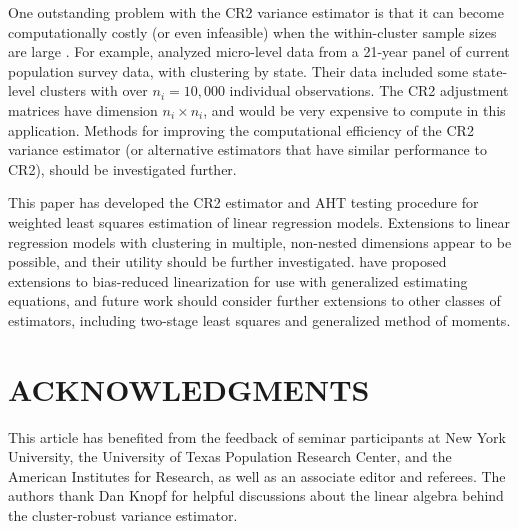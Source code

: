 \documentclass[12pt]{article}\usepackage[]{graphicx}\usepackage[]{color}
\begin{document}
One outstanding problem with the CR2 variance estimator is that it can become computationally costly (or even infeasible) when the within-cluster sample sizes are large \citep{Mackinnon2015wildCIs}. 
For example, \citet{Bertrand2004how} analyzed micro-level data from a 21-year panel of current population survey data, with clustering by state. Their data included some state-level clusters with over $n_i = 10,000$ individual observations. 
The CR2 adjustment matrices have dimension $n_i \times n_i$, and would be very expensive to compute in this application. 
Methods for improving the computational efficiency of the CR2 variance estimator (or alternative estimators that have similar performance to CR2), should be investigated further. 

This paper has developed the CR2 estimator and AHT testing procedure for weighted least squares estimation of linear regression models. 
Extensions to linear regression models with clustering in multiple, non-nested dimensions \citep[cf.][]{Cameron2011robust} appear to be possible, and their utility should be further investigated. 
\citet{McCaffrey2006improved} have proposed extensions to bias-reduced linearization for use with generalized estimating equations, and future work should consider further extensions to other classes of estimators, including two-stage least squares and generalized method of moments. 

\section*{ACKNOWLEDGMENTS}

This article has benefited from the feedback of seminar participants at New York University, the University of Texas Population Research Center, and the American Institutes for Research, as well as an associate editor and referees. The authors thank Dan Knopf for helpful discussions about the linear algebra behind the cluster-robust variance estimator.



\end{document}
